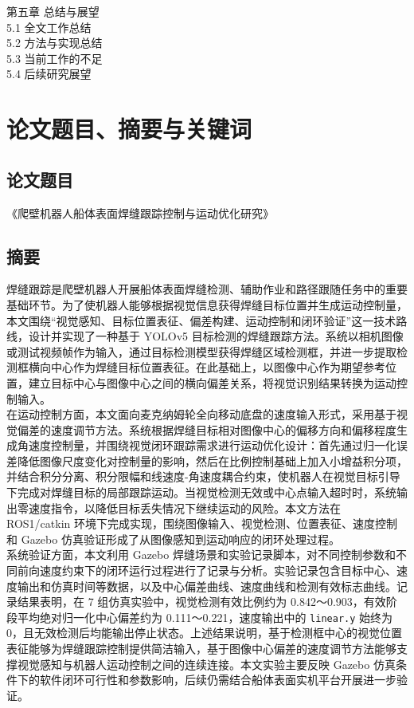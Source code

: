 \documentclass[UTF8,a4paper,12pt]{ctexrep}
\begin{document}
第五章 总结与展望\\
5.1 全文工作总结\\
5.2 方法与实现总结\\
5.3 当前工作的不足\\
5.4 后续研究展望\\

\chapter*{论文题目、摘要与关键词}

\section{论文题目}

《爬壁机器人船体表面焊缝跟踪控制与运动优化研究》\\

\section{摘要}

焊缝跟踪是爬壁机器人开展船体表面焊缝检测、辅助作业和路径跟随任务中的重要基础环节。为了使机器人能够根据视觉信息获得焊缝目标位置并生成运动控制量，本文围绕“视觉感知、目标位置表征、偏差构建、运动控制和闭环验证”这一技术路线，设计并实现了一种基于 YOLOv5 目标检测的焊缝跟踪方法。系统以相机图像或测试视频帧作为输入，通过目标检测模型获得焊缝区域检测框，并进一步提取检测框横向中心作为焊缝目标位置表征。在此基础上，以图像中心作为期望参考位置，建立目标中心与图像中心之间的横向偏差关系，将视觉识别结果转换为运动控制输入。\\

在运动控制方面，本文面向麦克纳姆轮全向移动底盘的速度输入形式，采用基于视觉偏差的速度调节方法。系统根据焊缝目标相对图像中心的偏移方向和偏移程度生成角速度控制量，并围绕视觉闭环跟踪需求进行运动优化设计：首先通过归一化误差降低图像尺度变化对控制量的影响，然后在比例控制基础上加入小增益积分项，并结合积分分离、积分限幅和线速度-角速度耦合约束，使机器人在视觉目标引导下完成对焊缝目标的局部跟踪运动。当视觉检测无效或中心点输入超时时，系统输出零速度指令，以降低目标丢失情况下继续运动的风险。本文方法在 ROS1/catkin 环境下完成实现，围绕图像输入、视觉检测、位置表征、速度控制和 Gazebo 仿真验证形成了从图像感知到运动响应的闭环处理过程。\\

系统验证方面，本文利用 Gazebo 焊缝场景和实验记录脚本，对不同控制参数和不同前向速度约束下的闭环运行过程进行了记录与分析。实验记录包含目标中心、速度输出和仿真时间等数据，以及中心偏差曲线、速度曲线和检测有效标志曲线。记录结果表明，在 7 组仿真实验中，视觉检测有效比例约为 0.842～0.903，有效阶段平均绝对归一化中心偏差约为 0.111～0.221，速度输出中的 \texttt{linear.y} 始终为 0，且无效检测后均能输出停止状态。上述结果说明，基于检测框中心的视觉位置表征能够为焊缝跟踪控制提供简洁输入，基于图像中心偏差的速度调节方法能够支撑视觉感知与机器人运动控制之间的连续连接。本文实验主要反映 Gazebo 仿真条件下的软件闭环可行性和参数影响，后续仍需结合船体表面实机平台开展进一步验证。\\
\end{document}
